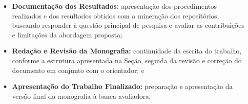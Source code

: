 \begin{itemize}[noitemsep, topsep=0pt]
    \item \textbf{Documentação dos Resultados:} apresentação dos procedimentos realizados e dos resultados obtidos com a mineração dos repositórios, buscando responder à questão principal de pesquisa e avaliar as contribuições e limitações da abordagem proposta;

    \item \textbf{Redação e Revisão da Monografia:} continuidade da escrita do trabalho, conforme a estrutura apresentada na Seção, seguida da revisão e correção do documento em conjunto com o orientador; e

    \item \textbf{Apresentação do Trabalho Finalizado:} preparação e apresentação da versão final da monografia à banca avaliadora.

\end{itemize}
